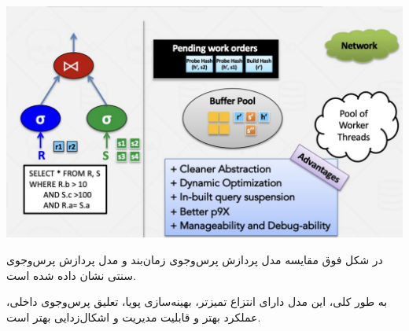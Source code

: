 \qquad\qquad\qquad	\includegraphics[width=0.7\linewidth]{screenshot008}

در شکل فوق مقایسه مدل پردازش پرس‌وجوی زمان‌بند و مدل پردازش پرس‌وجوی سنتی نشان داده شده است.

به طور کلی، این مدل دارای انتزاع تمیزتر، بهینه‌سازی پویا، تعلیق پرس‌وجوی داخلی، عملکرد بهتر و قابلیت مدیریت و اشکال‌زدایی بهتر است.










